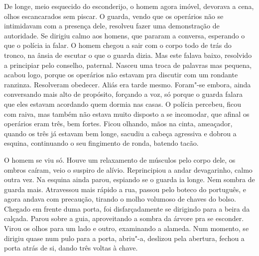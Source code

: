\begin{linenumbers}
De longe, meio esquecido do esconderijo, o homem agora imóvel, devorava
a cena, olhos escancarados sem piscar. O guarda, vendo que os operários
não se intimidavam com a presença dele, resolveu fazer uma demonstração
de autoridade. Se dirigiu calmo aos homens, que pararam a conversa,
esperando o que o polícia ia falar. O homem chegou a sair com o corpo
todo de trás do tronco, na ânsia de escutar o que o guarda dizia. Mas
este falava baixo, resolvido a principiar pelo conselho, paternal.
Nasceu uma troca de palavras mas pequena, acabou logo, porque os
operários não estavam pra discutir com um rondante ranzinza. Resolveram
obedecer. Aliás era tarde mesmo. Foram"-se embora, ainda conversando mais
alto de propósito, forçando a voz, só porque o guarda falara que eles
estavam acordando quem dormia nas casas. O polícia percebeu, ficou com
raiva, mas também não estava muito disposto a se incomodar, que afinal
os operários eram três, bem fortes. Ficou olhando, mãos na cinta,
ameaçador, quando os três já estavam bem longe, sacudiu a cabeça
agressiva e dobrou a esquina, continuando o seu fingimento de ronda,
batendo tacão.

O homem se viu só. Houve um relaxamento de músculos pelo corpo dele, os
ombros caíram, veio o suspiro de alívio. Reprincipiou a andar
devagarinho, calmo outra vez. Na esquina ainda parou, espiando se o
guarda ia longe. Nem sombra de guarda mais. Atravessou mais rápido a
rua, passou pelo boteco do português, e agora andava com precaução,
tirando o molho volumoso de chaves do bolso. Chegado em frente duma
porta, foi disfarçadamente se dirigindo para a beira da calçada. Parou
sobre a guia, aproveitando a sombra da árvore pra se esconder. Virou os
olhos para um lado e outro, examinando a alameda. Num momento, se
dirigiu quase num pulo para a porta, abriu"-a, deslizou pela abertura,
fechou a porta atrás de si, dando três voltas à chave.
\end{linenumbers}
